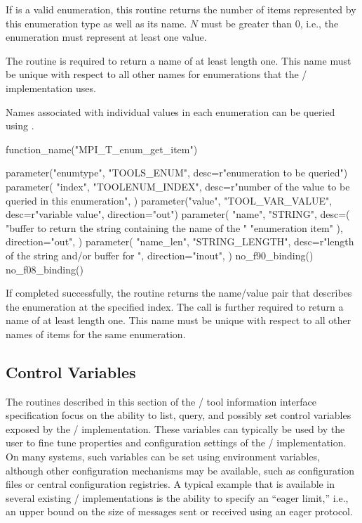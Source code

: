 If  is a valid enumeration, this routine returns the
number of items represented by this enumeration type as well as its name.
$N$ must be greater than $0$, i.e., the enumeration must represent at least
one value.



The routine is required to return a name of at least length one.  This name
must be unique with respect to all other names for enumerations that the
\MPI/ implementation uses.


Names associated with individual values in each enumeration
 can be queried using .


\begin{mpi-binding}
    function_name("MPI_T_enum_get_item")
    
    parameter("enumtype", "TOOLS_ENUM", desc=r"enumeration to be queried")
    parameter(
        "index",
        "TOOLENUM_INDEX",
        desc=r"number of the value to be queried in this enumeration",
    )
    parameter("value", "TOOL_VAR_VALUE", desc=r"variable value", direction="out")
    parameter(
        "name",
        "STRING",
        desc=(
            "buffer to return the string containing the name of the "
            "enumeration item"
        ),
        direction="out",
    )
    parameter(
        "name_len",
        "STRING_LENGTH",
        desc=r"length of the string and/or buffer for ",
        direction="inout",
    )
    no_f90_binding()
    no_f08_binding()
\end{mpi-binding}


If completed successfully, the routine returns the name/value pair that
describes the enumeration at the specified index.  The call is further
required to return a name of at least length one.  This name must be unique
with respect to all other names of items for the same enumeration.


\subsection{Control Variables}
\label{sec:mpit:cvar}

The routines described in this section of the \MPI/ tool information
interface specification focus on the ability to list, query, and possibly
set control variables exposed by the \MPI/ implementation.  These variables
can typically be used by the user to fine tune properties and configuration
settings of the \MPI/ implementation.  On many systems, such variables can
be set using environment variables, although other configuration mechanisms
may be available, such as configuration files or central configuration
registries.  A typical example that is available in several existing \MPI/
implementations is the ability to specify an ``eager limit,'' i.e., an
upper bound on the size of messages sent or received using an eager
protocol.


